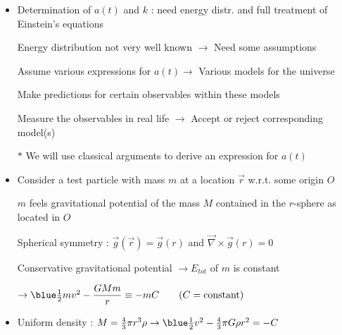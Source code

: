 \onecolumn
\begin{itemize}
\item Determination of $a(t)$ and $k$ : need energy distr. and full treatment of Einstein's equations
\item[] Energy distribution not very well known $\rightarrow$ Need some assumptions
\item[] Assume various expressions for $a(t) \rightarrow$ Various models for the universe
\item[] Make predictions for certain observables within these models
\item[] Measure the observables in real life $\rightarrow$ Accept or reject corresponding model(s)
\item[$\ast$] {\red We will use classical arguments to derive an expression for $a(t)$}
\item Consider a test particle with mass $m$ at a location $\vec{r}$ w.r.t. some origin $O$
\item[] $m$ feels gravitational potential of the mass $M$ contained in the $r$-sphere as located in $O$
\item[] Spherical symmetry : $\vec{g}(\vec{r})=\vec{g}(r)$ and $\vec{\nabla}\times\vec{g}(r)=0$
\item[] {\red Conservative gravitational potential $\rightarrow E_{tot}$ of $m$ is constant}
\item[] $\rightarrow {\blue \frac{1}{2}mv^{2}-{\displaystyle \frac{GMm}{r}} \equiv -mC} \qquad (C=\text{constant})$
\item Uniform density : $M=\frac{4}{3}\pi r^{3}\rho
                         \rightarrow {\blue \frac{1}{2}v^{2}-\frac{4}{3}\pi G\rho r^{2}=-C}$
\end{itemize}

